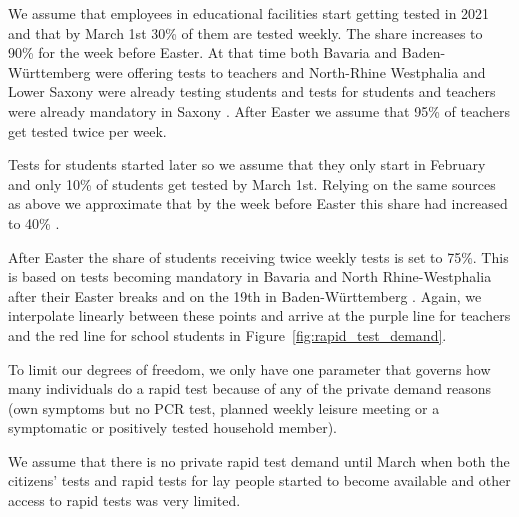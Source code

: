 
We assume that employees in educational facilities start getting tested in 2021 and that
by March 1st 30\% of them are tested weekly. The share increases to 90\% for the week
before Easter. At that time both Bavaria \citep{STMGP2021} and Baden-Württemberg
\citep{MinisteriumKultus2021} were offering tests to teachers and North-Rhine Westphalia
\citep{SchulministeriumNRW2021} and Lower Saxony \citep{NSMK2021} were already testing
students and tests for students and teachers were already mandatory in Saxony
\citep{SMK2021}. After Easter we assume that 95\% of teachers get tested twice per week.

Tests for students started later \citep{MinisteriumKultus2021, SchulministeriumNRW2021}
so we assume that they only start in February and only 10\% of students get tested by
March 1st. Relying on the same sources as above we approximate that by the week before
Easter this share had increased to 40\% \citep{SchulministeriumNRW2021}.

After Easter the share of students receiving twice weekly tests is set to 75\%. This is
based on tests becoming mandatory in Bavaria \citep{BayerischeStaatskanzlei2021} and
North Rhine-Westphalia \citep{SchulministeriumNRW2021b} after their Easter breaks and on
the 19th in Baden-Württemberg \citep{KMBaWue2021}. Again, we interpolate linearly between
these points and arrive at the purple line for teachers and the red line for school
students in Figure~\ref{fig:rapid_test_demand}.


To limit our degrees of freedom, we only have one parameter that governs how many
individuals do a rapid test because of any of the private demand reasons (own symptoms
but no PCR test, planned weekly leisure meeting or a symptomatic or positively tested
household member).

We assume that there is no private rapid test demand until March when both the citizens'
tests and rapid tests for lay people started to become available
\citep{Bundesanzeiger2021a, Bundesregierung2021} and other access to rapid tests was very
limited.

